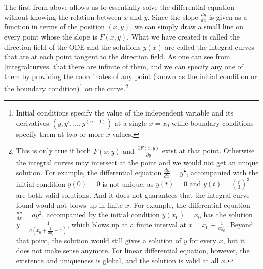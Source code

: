 \documentclass[english,a4paper,12pt]{report}
\begin{document}
The first from above allows us to essentially solve the differential equation without knowing the relation between \(x \text { and } y\). Since the slope \(\displaystyle \frac{dy}{dx} \) is given as a function in terms of the position \((x,y)\), we can simply draw a small line on every point whose the slope is \(F(x,y)\). What we have created is called the direction field of the ODE and the solutions \(y(x)\) are called the integral curves that are at each point tangent to the direction field. As one can see from \cref{integralcurves} that there are infinite of them, and we can specify any one of them by providing the coordinates of any point (known as the initial condition or the boundary condition)\footnote{Initial conditions specify the value of the independent variable and its derivatives \((y,y',\ldots ,y^{(n-1)} )\) at a single \(x = x_0 \) while boundary conditions specify them at two or more \(x\) values.} on the curve.\footnote{This is only true if both \(F(x,y) \text { and } \frac{\partial F(x,y)}{\partial y} \) exist at that point. Otherwise the integral curves may intersect at the point and we would not get an unique solution. For example, the differential equation \(\frac{dy}{dx} = y^{\frac{2}{3} } \), accompanied with the initial condition \(y(0) = 0\) is not unique, as \(y(t) = 0 \text { and } y(t) = (\frac{t}{3} )^3 \) are both valid solutions. And it does not guarantees that the integral curve found would not blows up in finite \(x\). For example, the differential equation \(\frac{dy}{dx} = ay^2 \), accompanied by the initial condition \(y(x_0 )= x_0 \) has the solution \(y = \frac{1}{a(x_0 +\frac{1}{ay_0 }-x )} \), which blows up at a finite interval at \(x = x_0 + \frac{1}{ay_0 } \). Beyond that point, the solution would still gives a solution of \(y\) for every \(x\), but it does not make sense anymore. For linear differential equation, however, the existence and uniqueness is global, and the solution is valid at all \(x\).} 

\end{document}
